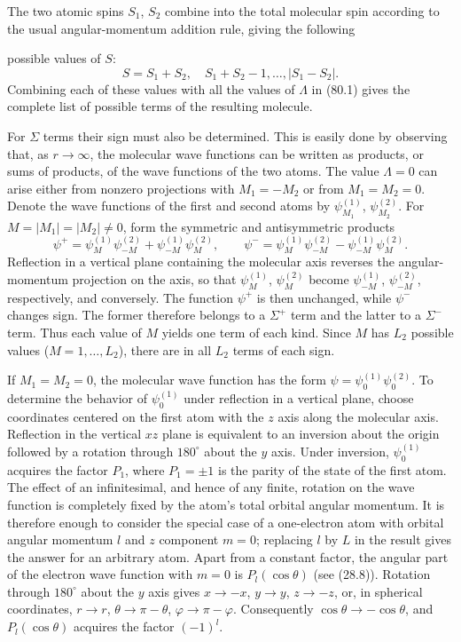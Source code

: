 The two atomic spins $S_1$, $S_2$ combine into the total molecular spin according to the usual angular-momentum addition rule, giving the following

possible values of $S$:
\begin{equation}
 S=S_1+S_2,\quad S_1+S_2-1,\ldots,|S_1-S_2|.
 \tag{80.2}
\end{equation}
Combining each of these values with all the values of $\Lambda$ in (80.1) gives the complete list of possible terms of the resulting molecule.

For $\Sigma$ terms their sign must also be determined. This is easily done by observing that, as $r\to\infty$, the molecular wave functions can be written as products, or sums of products, of the wave functions of the two atoms. The value $\Lambda=0$ can arise either from nonzero projections with $M_1=-M_2$ or from $M_1=M_2=0$. Denote the wave functions of the first and second atoms by $\psi_{M_1}^{(1)}$, $\psi_{M_2}^{(2)}$. For $M=|M_1|=|M_2|\ne0$, form the symmetric and antisymmetric products
\[
 \psi^+=\psi_M^{(1)}\psi_{-M}^{(2)}+\psi_{-M}^{(1)}\psi_M^{(2)},\qquad
 \psi^-=\psi_M^{(1)}\psi_{-M}^{(2)}-\psi_{-M}^{(1)}\psi_M^{(2)}.
\]
Reflection in a vertical plane containing the molecular axis reverses the angular-momentum projection on the axis, so that $\psi_M^{(1)}$, $\psi_M^{(2)}$ become $\psi_{-M}^{(1)}$, $\psi_{-M}^{(2)}$, respectively, and conversely. The function $\psi^+$ is then unchanged, while $\psi^-$ changes sign. The former therefore belongs to a $\Sigma^+$ term and the latter to a $\Sigma^-$ term. Thus each value of $M$ yields one term of each kind. Since $M$ has $L_2$ possible values ($M=1,\ldots,L_2$), there are in all $L_2$ terms of each sign.

If $M_1=M_2=0$, the molecular wave function has the form $\psi=\psi_0^{(1)}\psi_0^{(2)}$. To determine the behavior of $\psi_0^{(1)}$ under reflection in a vertical plane, choose coordinates centered on the first atom with the $z$ axis along the molecular axis. Reflection in the vertical $xz$ plane is equivalent to an inversion about the origin followed by a rotation through $180^\circ$ about the $y$ axis. Under inversion, $\psi_0^{(1)}$ acquires the factor $P_1$, where $P_1=\pm1$ is the parity of the state of the first atom. The effect of an infinitesimal, and hence of any finite, rotation on the wave function is completely fixed by the atom's total orbital angular momentum. It is therefore enough to consider the special case of a one-electron atom with orbital angular momentum $l$ and $z$ component $m=0$; replacing $l$ by $L$ in the result gives the answer for an arbitrary atom. Apart from a constant factor, the angular part of the electron wave function with $m=0$ is $P_l(\cos\theta)$ (see (28.8)). Rotation through $180^\circ$ about the $y$ axis gives $x\to-x$, $y\to y$, $z\to-z$, or, in spherical coordinates, $r\to r$, $\theta\to\pi-\theta$, $\varphi\to\pi-\varphi$. Consequently $\cos\theta\to-\cos\theta$, and $P_l(\cos\theta)$ acquires the factor $(-1)^l$.

